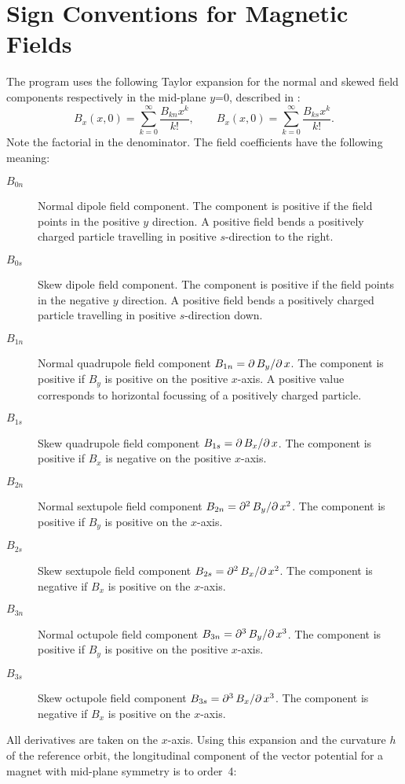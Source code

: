 \section{Sign Conventions for Magnetic Fields}
\label{sec:sign}
The \opalmap program uses the following Taylor expansion for the normal and
skewed field components respectively in the mid-plane $y$=0,
described in :
\[
B_x(x,0)=\sum_{k=0}^{\infty}\frac{B_{kn}x^k}{k!}, \qquad
B_x(x,0)=\sum_{k=0}^{\infty}\frac{B_{ks}x^k}{k!}.
\]
Note the factorial in the denominator.
The field coefficients have the following meaning:
\begin{description}
\item[$B_{0n}$] Normal dipole field component.
  The component is positive if the field points in the positive $y$
  direction.
  A positive field bends a positively charged particle travelling in
  positive $s$-direction to the right.
\item[$B_{0s}$] Skew dipole field component.
  The component is positive if the field points in the negative $y$
  direction.
  A positive field bends a positively charged particle travelling in
  positive $s$-direction down.
\item[$B_{1n}$] Normal quadrupole field component
  $B_{1n}=\uglyparder{B_y}{x}$.
  The component is positive if $B_y$ is positive on the positive $x$-axis.
  A positive value corresponds to horizontal focussing of a positively
  charged particle.
\item[$B_{1s}$] Skew quadrupole field component
  $B_{1s}=\uglyparder{B_x}{x}$.
  The component is positive if $B_x$ is negative on the positive $x$-axis.
\item[$B_{2n}$] Normal sextupole field component
  $B_{2n}=\uglyparder[2]{B_y}{x}$.
  The component is positive if $B_y$ is positive on the $x$-axis.
\item[$B_{2s}$] Skew sextupole field component
  $B_{2s}=\uglyparder[2]{B_x}{x}$.
  The component is negative if $B_x$ is positive on the $x$-axis.
\item[$B_{3n}$] Normal octupole field component
  $B_{3n}=\uglyparder[3]{B_y}{x}$.
  The component is positive if $B_y$ is positive on the positive $x$-axis.
\item[$B_{3s}$] Skew octupole field component
  $B_{3s}=\uglyparder[3]{B_x}{x}$.
  The component is negative if $B_x$ is positive on the $x$-axis.
\end{description}
All derivatives are taken on the $x$-axis.
Using this expansion and the curvature $h$ of the reference orbit,
the longitudinal component of the vector potential for a magnet with
mid-plane symmetry is to order~4:

